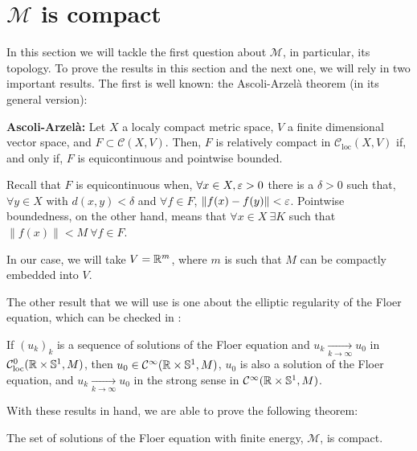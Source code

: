 \section{$\mathcal{M}$ is compact} \label{section:floerq_compact}

In this section we will tackle the first question about $\mathcal{M}$, in particular, its topology. To prove the results in this section and the next one, we will rely in two important results. The first is well known: the Ascoli-Arzelà theorem (in its general version):

\begin{theo} \label{ascoli_arzela}
{\bf Ascoli-Arzelà:} Let $X$ a localy compact metric space, $V$ a finite dimensional vector space, and $F \subset \mathcal{C}(X,V)$. Then, $F$ is relatively compact in $\mathcal{C}_{\text{loc}}(X,V)$ if, and only if, $F$ is equicontinuous and pointwise bounded.

Recall that $F$ is equicontinuous when, $\forall x \in X, \varepsilon > 0$ there is a $\delta > 0$ such that, $\forall y \in X$ with $d(x,y) < \delta$ and $\forall f \in F$, $\|f(x)-f(y)\| < \varepsilon$. Pointwise boundedness, on the other hand, means that $\forall x \in X \ \exists K$ such that $\|f(x)\| < M \ \forall f \in F$.
\end{theo}

In our case, we will take $V = \mathbb{R}^m$, where $m$ is such that $M$ can be compactly embedded into $V$. 

The other result that we will use is one about the elliptic regularity of the Floer equation, which can be checked in \cite{audin2014morse}:

\begin{prop} \label{floereq_ellipticreg}
If $(u_k)_k$ is a sequence of solutions of the Floer equation and $u_k \xrightarrow[k \rightarrow \infty]{} u_0$ in $\mathcal{C}_{\text{loc}}^0(\mathbb{R} \times \mathbb{S}^1,M)$, then $u_0 \in \mathcal{C}^{\infty}(\mathbb{R} \times \mathbb{S}^1,M)$, $u_0$ is also a solution of the Floer equation, and $u_k \xrightarrow[k \rightarrow \infty]{} u_0$ in the strong sense in $\mathcal{C}^{\infty}(\mathbb{R} \times \mathbb{S}^1,M)$.
\end{prop}

With these results in hand, we are able to prove the following theorem:

\begin{theo} \label{floer_compact}
The set of solutions of the Floer equation with finite energy, $\mathcal{M}$, is compact.
\end{theo}

